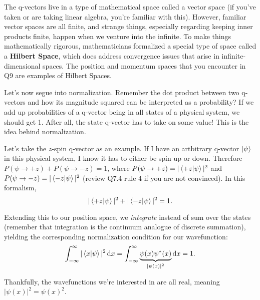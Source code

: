 \documentclass{article}
\begin{document}
\begin{tcolorbox}[arc=2mm, colback=magenta!15!white, colframe=magenta!80!black, title=\textsc{Hilbert Spaces (Enrichment)}]
    The q-vectors live in a type of mathematical space called a vector space (if you've taken or are taking linear algebra, you're familiar with this). However, familiar vector spaces are all finite, and strange things, especially regarding keeping inner products finite, happen when we venture into the infinite. To make things mathematically rigorous, mathematicians formalized a special type of space called a \textbf{Hilbert Space}, which does address convergence issues that arise in infinite-dimensional spaces. The position and momentum spaces that you encounter in Q9 are examples of Hilbert Spaces.
\end{tcolorbox}

Let's now segue into normalization. Remember the dot product between two q-vectors and how its magnitude squared can be interpreted as a probability? If we add up probabilities of a q-vector being in all states of a physical system, we should get 1. After all, the state q-vector has to take on some value! This is the idea behind normalization.

\vspace{1em}

Let's take the $z$-spin q-vector as an example. If I have an artbitrary q-vector $\ket{\psi}$ in this physical system, I know it has to either be spin up or down. Therefore $P(\psi \to +z) + P(\psi \to -z) = 1$, where $P(\psi \to +z) = |\braket{+z}{\psi}|^2$ and $P(\psi \to -z) = |\braket{-z}{\psi}|^2$ (review Q7.4 rule 4 if you are not convinced). In this formalism, 
\[
|\braket{+z}{\psi}|^2 + |\braket{-z}{\psi}|^2 = 1.
\]

Extending this to our position space, we \textit{integrate} instead of sum over the states (remember that integration is the continuum analogue of discrete summation), yielding the corresponding normalization condition for our wavefunction:
\[
\int_{-\infty}^{\infty} |\braket{x}{\psi}|^2 \dd{x} = \int_{-\infty}^{\infty} \underbrace{\psi(x) \psi^*(x)}_{|\psi(x)|^2} \dd{x} = 1.
\]

Thankfully, the wavefunctions we're interested in are all real, meaning $|\psi(x)|^2 = \psi(x)^2$.
\end{document}
